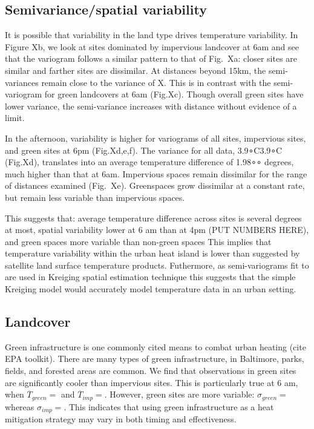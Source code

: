 \documentclass[draft,linenumbers]{agujournal}
\begin{document}



\subsection{Semivariance/spatial variability}

It is possible that variability in the land type drives temperature variability. In Figure Xb, we look at sites dominated by impervious landcover at 6am and see that the variogram follows a similar pattern to that of Fig.~Xa: closer sites are similar and farther sites are dissimilar. At distances beyond 15km, the semi-variances remain close to the variance of X. This is in contrast with the semi-variogram for green landcovers at 6am (Fig.Xc). Though overall green sites have lower variance, the semi-variance increases with distance without evidence of a limit.

In the afternoon, variability is higher for variograms of all sites, impervious sites, and green sites at 6pm (Fig.Xd,e,f). The variance for all data, 3.9∘C3.9∘C (Fig.Xd), translates into an average temperature difference of 1.98∘∘ degrees, much higher than that at 6am. Impervious spaces remain dissimilar for the range of distances examined (Fig.~Xe). Greenspaces grow dissimilar at a constant rate, but remain less variable than impervious spaces.

This suggests that: average temperature difference across sites is several degrees at most, spatial variability lower at 6 am than at 4pm (PUT NUMBERS HERE), and green spaces more variable than non-green spaces This implies that temperature variability within the urban heat island is lower than suggested by satellite land surface temperature products. Futhermore, as semi-variograms fit to are used in Kreiging spatial estimation technique this suggests that the simple Kreiging model would accurately model temperature data in an urban setting.

\subsection{Landcover}
Green infrastructure is one commonly cited means to combat urban heating (cite EPA toolkit). There are many types of green infrastructure, in Baltimore, parks, fields, and forested areas are common. We find that 
observations in green sites are significantly cooler than impervious sites. This is particularly true at 6 am, when $\overline{T}_{green} = $ and $\overline{T}_{imp} = $.
However, green sites are more variable: $\sigma_{green} = $ whereas $\sigma_{imp} = $. This indicates that using green infrastructure as a heat mitigation strategy may vary in both timing and effectiveness. 
\end{document}
